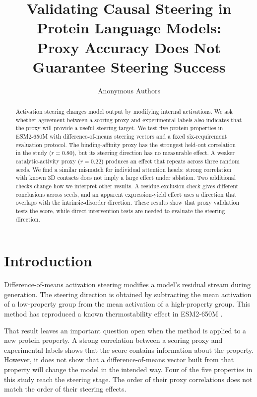 \documentclass{article}
\title{Validating Causal Steering in Protein Language Models: \\
Proxy Accuracy Does Not Guarantee Steering Success}
\author{Anonymous Authors}
\begin{document}
\maketitle

\begin{abstract}
Activation steering changes model output by modifying internal
activations. We ask whether agreement between a scoring proxy and
experimental labels also indicates that the proxy will provide a useful
steering target. We test five protein properties in ESM2-650M with
difference-of-means steering vectors and a fixed six-requirement
evaluation protocol. The binding-affinity proxy has the strongest
held-out correlation in the study ($r=0.80$), but its steering direction
has no measurable effect. A weaker catalytic-activity proxy ($r=0.22$)
produces an effect that repeats across three random seeds. We find a
similar mismatch for individual attention heads: strong correlation with
known 3D contacts does not imply a large effect under ablation. Two
additional checks change how we interpret other results. A
residue-exclusion check gives different conclusions across seeds, and an
apparent expression-yield effect uses a direction that overlaps with the
intrinsic-disorder direction. These results show that proxy validation
tests the score, while direct intervention tests are needed to evaluate
the steering direction.
\end{abstract}

\section{Introduction}

Difference-of-means activation steering modifies a model's residual
stream during generation. The steering direction is obtained by
subtracting the mean activation of a low-property group from the mean
activation of a high-property group. This method has reproduced a known
thermostability effect in ESM2-650M \citep{huang2025steering}.

That result leaves an important question open when the method is applied
to a new protein property. A strong correlation between a scoring proxy
and experimental labels shows that the score contains information about
the property. However, it does not show that a difference-of-means vector
built from that property will change the model in the intended way. Four
of the five properties in this study reach the steering stage. The order
of their proxy correlations does not match the order of their steering
effects.
\end{document}
